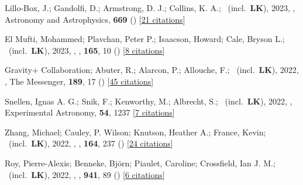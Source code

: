 \item[{\color{numcolor}\scriptsize79}] Lillo-Box, J.; Gandolfi, D.; Armstrong, D. J.; Collins, K. A.; \etal\ (incl.\ \textbf{LK}), 2023, , Astronomy and Astrophysics, \textbf{669} () [\href{https://ui.adsabs.harvard.edu/abs/2023A&A...669A.109L}{21 citations}]

\item[{\color{numcolor}\scriptsize78}] El Mufti, Mohammed; Plavchan, Peter P.; Isaacson, Howard; Cale, Bryson L.; \etal\ (incl.\ \textbf{LK}), 2023, , \aj, \textbf{165}, 10 () [\href{https://ui.adsabs.harvard.edu/abs/2023AJ....165...10E}{8 citations}]

\item[{\color{numcolor}\scriptsize77}] Gravity+ Collaboration; Abuter, R.; Alarcon, P.; Allouche, F.; \etal\ (incl.\ \textbf{LK}), 2022, , The Messenger, \textbf{189}, 17 () [\href{https://ui.adsabs.harvard.edu/abs/2022Msngr.189...17A}{45 citations}]

\item[{\color{numcolor}\scriptsize76}] Snellen, Ignas A. G.; Snik, F.; Kenworthy, M.; Albrecht, S.; \etal\ (incl.\ \textbf{LK}), 2022, , Experimental Astronomy, \textbf{54}, 1237 [\href{https://ui.adsabs.harvard.edu/abs/2022ExA....54.1237S}{7 citations}]

\item[{\color{numcolor}\scriptsize75}] Zhang, Michael; Cauley, P. Wilson; Knutson, Heather A.; France, Kevin; \etal\ (incl.\ \textbf{LK}), 2022, , \aj, \textbf{164}, 237 () [\href{https://ui.adsabs.harvard.edu/abs/2022AJ....164..237Z}{24 citations}]

\item[{\color{numcolor}\scriptsize74}] Roy, Pierre-Alexis; Benneke, Bj{\"o}rn; Piaulet, Caroline; Crossfield, Ian J. M.; \etal\ (incl.\ \textbf{LK}), 2022, , \apj, \textbf{941}, 89 () [\href{https://ui.adsabs.harvard.edu/abs/2022ApJ...941...89R}{6 citations}]

